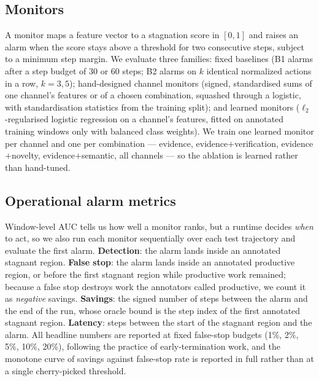 \subsection{Monitors}
A monitor maps a feature vector to a stagnation score in $[0,1]$ and raises an alarm when the score stays
above a threshold for two consecutive steps, subject to a minimum step margin. We evaluate three families:
fixed baselines (B1 alarms after a step budget of 30 or 60 steps; B2 alarms on $k$ identical normalized
actions in a row, $k=3,5$); hand-designed channel monitors (signed, standardised sums of one channel's
features or of a chosen combination, squashed through a logistic, with standardisation statistics from the
training split); and learned monitors ($\ell_2$-regularised logistic regression on a channel's features,
fitted on annotated training windows only with balanced class weights). We train one learned monitor per
channel and one per combination --- evidence, evidence$+$verification, evidence$+$novelty,
evidence$+$semantic, all channels --- so the ablation is learned rather than hand-tuned.

\subsection{Operational alarm metrics}
Window-level AUC tells us how well a monitor ranks, but a runtime decides \emph{when} to act, so we also run
each monitor sequentially over each test trajectory and evaluate the first alarm. \textbf{Detection}: the
alarm lands inside an annotated stagnant region. \textbf{False stop}: the alarm lands inside an annotated
productive region, or before the first stagnant region while productive work remained; because a false stop
destroys work the annotators called productive, we count it as \emph{negative} savings. \textbf{Savings}:
the signed number of steps between the alarm and the end of the run, whose oracle bound is the step index
of the first annotated stagnant region. \textbf{Latency}: steps between the start of the stagnant region
and the alarm. All headline numbers are reported at fixed false-stop budgets (1\%, 2\%, 5\%, 10\%, 20\%),
following the practice of early-termination work, and the monotone curve of savings against false-stop rate
is reported in full rather than at a single cherry-picked threshold.
